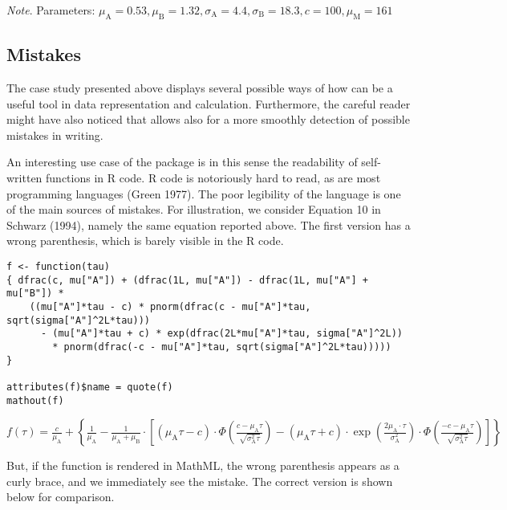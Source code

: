 \emph{Note}. Parameters: \(\mu_ \mathrm A = 0.53, \mu_ \mathrm B = 1.32, \sigma_ \mathrm A = 4.4, \sigma_ \mathrm B = 18.3, c = 100, \mu_\mathrm M = 161\)

\hypertarget{mistakes}{%
\subsection{Mistakes}\label{mistakes}}

The case study presented above displays several possible ways of how  can be a useful tool in data representation and calculation. Furthermore, the careful reader might have also noticed that  allows also for a more smoothly detection of possible mistakes in writing.

An interesting use case of the package is in this sense the readability of self-written
functions in R code. R code is notoriously hard to read, as are most programming
languages (Green 1977). The poor legibility of the language is one of the main
sources of mistakes. For illustration, we consider Equation 10 in
Schwarz (1994), namely the same equation reported above. The first version has a wrong parenthesis, which is barely visible in the R code.

\begin{verbatim}
f <- function(tau)
{ dfrac(c, mu["A"]) + (dfrac(1L, mu["A"]) - dfrac(1L, mu["A"] + mu["B"]) * 
    ((mu["A"]*tau - c) * pnorm(dfrac(c - mu["A"]*tau, sqrt(sigma["A"]^2L*tau)))
      - (mu["A"]*tau + c) * exp(dfrac(2L*mu["A"]*tau, sigma["A"]^2L))
        * pnorm(dfrac(-c - mu["A"]*tau, sqrt(sigma["A"]^2L*tau)))))
}

attributes(f)$name = quote(f)
mathout(f)
\end{verbatim}

\({{{f}\left(\tau\right)}={\displaystyle{\frac{{c}}{{\mu_\mathrm{A}}}}+\left\{{\displaystyle{\frac{{1}}{{\mu_\mathrm{A}}}}-{\displaystyle{\frac{{1}}{{{\mu_\mathrm{A}}+{\mu_\mathrm{B}}}}}\cdot\left[{{\left({{{\mu_\mathrm{A}}{}\tau}-{c}}\right)\cdot{\Phi\left(\displaystyle{\frac{{{c}-{{\mu_\mathrm{A}}{}\tau}}}{\sqrt{{{\sigma_\mathrm{A}^{2}}{}\tau}}}}\right)}}-{{\left({{{\mu_\mathrm{A}}{}\tau}+{c}}\right)\cdot{\exp\left(\displaystyle{\frac{{{{2}{}{\mu_\mathrm{A}}}\cdot\tau}}{{\sigma_\mathrm{A}^{2}}}}\right)}}\cdot{\Phi\left(\displaystyle{\frac{{{-{c}}-{{\mu_\mathrm{A}}{}\tau}}}{\sqrt{{{\sigma_\mathrm{A}^{2}}{}\tau}}}}\right)}}}\right]}}\right\}}}\)

But, if the function is rendered in MathML, the wrong parenthesis appears as a curly
brace, and we immediately see the mistake. The correct version is shown below
for comparison.


